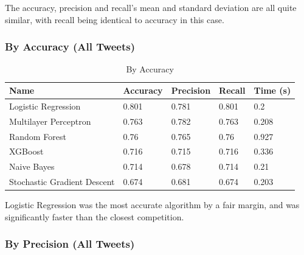 \documentclass{article}
\begin{document}
The accuracy, precision and recall's mean and standard deviation are all quite similar, with recall being identical to accuracy in this case.

\subsubsection{By Accuracy (All Tweets)}

\begin{table}[h!]
	\begin{center}
		\caption{By Accuracy}
		\label{tab:table1}
		\begin{tabular}{l|l|l|l|l}
			\textbf{Name}               & \textbf{Accuracy} & \textbf{Precision} & \textbf{Recall} & \textbf{Time (s)} \\
			\hline
			Logistic Regression         & 0.801             & 0.781              & 0.801           & 0.2               \\
			Multilayer Perceptron       & 0.763             & 0.782              & 0.763           & 0.208             \\
			Random Forest               & 0.76              & 0.765              & 0.76            & 0.927             \\
			XGBoost                     & 0.716             & 0.715              & 0.716           & 0.336             \\
			Naive Bayes                 & 0.714             & 0.678              & 0.714           & 0.21              \\
			Stochastic Gradient Descent & 0.674             & 0.681              & 0.674           & 0.203             \\
		\end{tabular}
	\end{center}
\end{table}

Logistic Regression was the most accurate algorithm by a fair margin, and was significantly faster than the closest competition.

\subsubsection{By Precision (All Tweets)}
\end{document}
